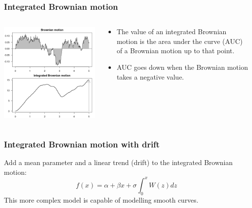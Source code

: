 \documentclass{beamer}
\begin{document}
\begin{frame}
  \frametitle{Integrated Brownian motion}

  \begin{columns}
    \begin{column}{5cm}
      \includegraphics[scale=0.4]{figures/integrated.png}
    \end{column}
    \begin{column}{4cm}
      \begin{itemize}
      \item The value of an integrated Brownian motion is the area
        under the curve (AUC) of a Brownian motion up to that point.
      \item AUC goes down when the Brownian motion takes a negative
        value.
      \end{itemize}
    \end{column}
  \end{columns}

\end{frame}

\begin{frame}
  \frametitle{Integrated Brownian motion with drift}

  Add a mean parameter and a linear trend (drift) to the
  integrated Brownian motion:
  \[
  f(x) = \alpha + \beta x + \sigma \int_{0}^x W(z) dz
  \]
  This more complex model is capable of modelling smooth curves.

\end{frame}
\end{document}
